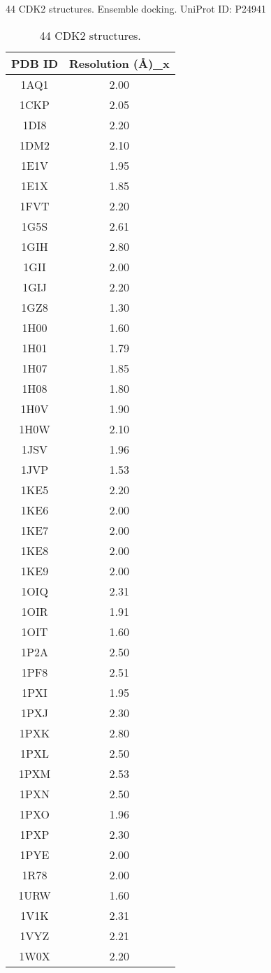 44 CDK2 structures. Ensemble docking. UniProt ID: P24941

\begin{table}
\caption{44 CDK2 structures.}
\label{cdk2:PDBs}
\begin{tabular}{cc}
\hline
PDB ID & Resolution (\AA)\_x\\
\hline
1AQ1 & 2.00\\
1CKP & 2.05\\
1DI8 & 2.20\\
1DM2 & 2.10\\
1E1V & 1.95\\
1E1X & 1.85\\
1FVT & 2.20\\
1G5S & 2.61\\
1GIH & 2.80\\
1GII & 2.00\\
1GIJ & 2.20\\
1GZ8 & 1.30\\
1H00 & 1.60\\
1H01 & 1.79\\
1H07 & 1.85\\
1H08 & 1.80\\
1H0V & 1.90\\
1H0W & 2.10\\
1JSV & 1.96\\
1JVP & 1.53\\
1KE5 & 2.20\\
1KE6 & 2.00\\
1KE7 & 2.00\\
1KE8 & 2.00\\
1KE9 & 2.00\\
1OIQ & 2.31\\
1OIR & 1.91\\
1OIT & 1.60\\
1P2A & 2.50\\
1PF8 & 2.51\\
1PXI & 1.95\\
1PXJ & 2.30\\
1PXK & 2.80\\
1PXL & 2.50\\
1PXM & 2.53\\
1PXN & 2.50\\
1PXO & 1.96\\
1PXP & 2.30\\
1PYE & 2.00\\
1R78 & 2.00\\
1URW & 1.60\\
1V1K & 2.31\\
1VYZ & 2.21\\
1W0X & 2.20\\
\hline
\end{tabular}
\end{table}

